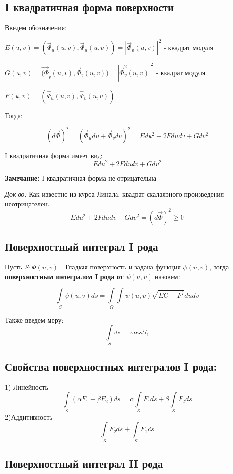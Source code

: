 \documentclass[12pt, english]{article}
\begin{document}
\subsection{I квадратичная форма поверхности}
	
	Введем обозначения:
		
	$E(u , v) = (\vec{\Phi}_u(u , v) , \vec{\Phi}_u( u, v)) = |\vec{\Phi}_u( u, v)|^2$ - квадрат модуля
	
	$G(u , v) = \vec{(\Phi}_v(u , v) , \vec{\Phi}_v( u, v)) = |\vec{\Phi}_v^2( u, v)|^2$ - квадрат модуля
	
	$F(u , v) = (\vec{\Phi}_u(u , v) , \vec{\Phi}_v( u, v))$ 
	
	Тогда:
	
	$$(d\vec{\Phi})^2 = (\vec{\Phi}_u du + \vec{\Phi}_v dv)^2 = Edu^2 + 2Fdudv + Gdv^2$$
	
	I квадратичная форма имеет вид:
	$$Edu^2 + 2Fdudv + Gdv^2$$			
	
\textbf{Замечание:}
	I квадратичная форма не отрицательна
	
\textit{Док-во:}
Как известно из курса Линала, квадрат скалаярного произведения неотрицателен.
	$$Edu^2 + 2Fdudv + Gdv^2 = (d\vec{\Phi})^2 \geqslant 0$$
	
\subsection{Поверхностный интеграл I рода}
	Пусть $S : \Phi(u , v)$ - Гладкая поверхность и задана функция $\psi(u , v)$, тогда \textbf{поверхностным интегралом I рода от $\psi(u,v)$} назовем:
	
$$
\int\limits_{S} \psi(u , v) ds 
=
\int\limits_{\Omega}\int \psi(u,v)\sqrt{EG - F^2}dudv	
$$		
	
	Также введем меру:
$$
	\int\limits_{S}ds = mesS;
$$	
	
\subsection{Свойства поверхностных интегралов I рода:}
	1) Линейность
$$
\int\limits_{S} (\alpha F_1 + \beta F_2)ds
=
\alpha\int\limits_{S}  F_1ds
+
\beta\int\limits_{S}  F_2ds
$$
	2)Аддитивность	
$$
\int\limits_{S}  F_2ds
+
\int\limits_{S}  F_1ds
$$



\subsection{Поверхностный интеграл II рода}
\end{document}
